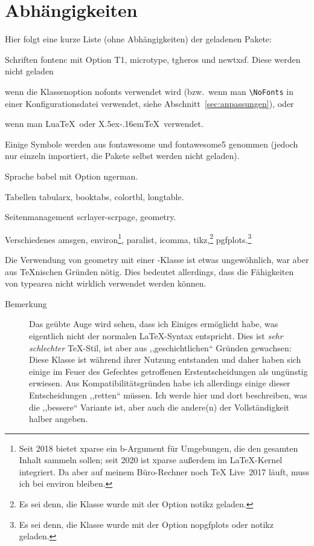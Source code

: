 \documentclass[hyperworksheet]{drcschool}
\newcommand*{\pkg}[1]{\textup{\ttfamily#1}}                                %
\newcommand*{\opt}[1]{\textup{\ttfamily#1}}                                %
\begin{document}
\section{Abhängigkeiten}
Hier folgt eine kurze Liste (ohne Abhängigkeiten) der geladenen Pakete:\par\medskip\noindent
\begin{compactdesc}
\item[Schriften] \pkg{fontenc} mit Option \opt{T1}, \pkg{microtype}, \pkg{tgheros} und \pkg{newtxsf}.
   Diese werden nicht geladen
   \begin{compactitem}
   \item wenn die Klassenoption \opt{nofonts} verwendet wird (bzw.~wenn man
   \verb=\NoFonts= in einer Konfigurationsdatei verwendet, siehe
   Abschnitt~\ref{sec:anpassungen}), oder
   \item wenn man Lua\TeX\ oder X\lower.5ex\hbox{}\kern-.16em\TeX\
         verwendet.
   \end{compactitem}
   Einige Symbole werden aus \pkg{fontawesome} und \pkg{fontawesome5} genommen
   (jedoch nur einzeln importiert, die Pakete selbst werden nicht geladen).
\item[Sprache] \pkg{babel} mit Option \opt{ngerman}.
\item[Tabellen] \pkg{tabularx}, \pkg{booktabs}, \pkg{colortbl}, \pkg{longtable}.
\item[Seitenmanagement] \pkg{scrlayer-scrpage}, \pkg{geometry}.
\item[Verschiedenes] \pkg{amsgen}, \pkg{environ}\footnote{%
   Seit 2018 bietet \pkg{xparse} ein \opt{b}-Argument für Umgebungen, die den gesamten Inhalt
   sammeln sollen; seit 2020 ist \pkg{xparse} außerdem im \LaTeX-Kernel integriert. Da aber
   auf meinem Büro-Rechner noch TeX Live~2017 läuft, muss ich bei \pkg{environ} bleiben.},
   \pkg{paralist}, \pkg{icomma}, \pkg{tikz},\footnote{Es sei denn, die Klasse wurde mit der Option \opt{notikz} geladen.}
    \pkg{pgfplots}.\footnote{Es sei denn, die Klasse wurde mit der Option \opt{nopgfplots} oder \opt{notikz} geladen.}
\end{compactdesc}
Die Verwendung von \pkg{geometry} mit einer \KOMAScript-Klasse ist etwas
ungewöhnlich, war aber aus \TeX nischen Gründen nötig. Dies bedeutet allerdings,
dass die Fähigkeiten von \pkg{typearea} nicht wirklich verwendet werden können.

\begin{description}
\item[Bemerkung]
Das geübte Auge wird sehen, dass ich Einiges ermöglicht habe, was eigentlich
nicht der normalen \LaTeX-Syntax entspricht.
Dies ist \emph{sehr schlechter} \TeX-Stil,
ist aber aus ,,geschichtlichen`` Gründen gewachsen: Diese Klasse ist während ihrer Nutzung
entstanden und daher haben sich einige im Feuer des Gefechtes getroffenen
Erstentscheidungen als ungünstig erwiesen. Aus Kompatibilitätsgründen habe
ich allerdings einige dieser Entscheidungen ,,retten`` müssen. Ich werde
hier und dort beschreiben, was die ,,bessere`` Variante ist, aber auch die andere(n)
der Vollständigkeit halber angeben.
\end{description}
\end{document}
